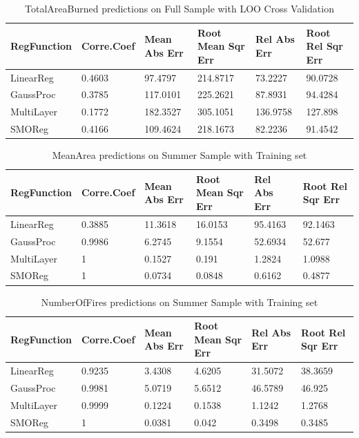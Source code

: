 \documentclass[runningheads]{llncs}
\begin{document}
\begin{table}[H]
\caption{TotalAreaBurned  predictions on Full Sample with LOO Cross Validation}\label{tab6}
\begin{tabular}{|l|l|l|l|l|l|}
\hline
RegFunction & Corre.\break Coef & Mean Abs Err & Root Mean Sqr Err & Rel Abs Err &Root Rel Sqr Err\\
\hline
LinearReg & 0.4603 & 97.4797 & 214.8717 & 73.2227 & 90.0728  \\
GaussProc & 0.3785 & 117.0101 & 225.2621 & 87.8931 & 94.4284 \\
MultiLayer & 0.1772  & 182.3527 & 305.1051 & 136.9758 & 127.898 \\
SMOReg & 0.4166 & 109.4624 & 218.1673 & 82.2236 & 91.4542 \\
\hline
\end{tabular}
\end{table}

\begin{table}[H]
\caption{MeanArea predictions on Summer Sample with Training set}\label{tab7}
\begin{tabular}{|l|l|l|l|l|l|}
\hline
RegFunction & Corre.\break Coef & Mean Abs Err & Root Mean Sqr Err & Rel Abs Err &Root Rel Sqr Err\\
\hline
LinearReg & 0.3885 & 11.3618 & 16.0153 & 95.4163 & 92.1463  \\
GaussProc & 0.9986 & 6.2745 & 9.1554 & 52.6934 & 52.677 \\
MultiLayer & 1 & 0.1527 & 0.191 & 1.2824 & 1.0988 \\
SMOReg & 1 & 0.0734 & 0.0848 & 0.6162 & 0.4877 \\
\hline
\end{tabular}
\end{table}

\begin{table}[H]
\caption{NumberOfFires predictions on Summer Sample with Training set}\label{tab8}
\begin{tabular}{|l|l|l|l|l|l|}
\hline
RegFunction & Corre.\break Coef & Mean Abs Err & Root Mean Sqr Err & Rel Abs Err &Root Rel Sqr Err\\
\hline
LinearReg & 0.9235  & 3.4308 & 4.6205 & 31.5072  & 38.3659  \\
GaussProc & 0.9981 & 5.0719 & 5.6512 & 46.5789 & 46.925 \\
MultiLayer & 0.9999 & 0.1224 & 0.1538 & 1.1242 & 1.2768\\
SMOReg & 1 & 0.0381 & 0.042 & 0.3498 & 0.3485 \\
\hline
\end{tabular}
\end{table}
\end{document}
